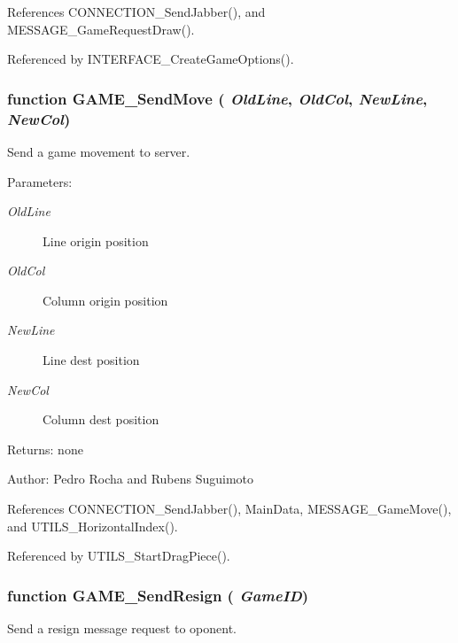 References CONNECTION\_\-SendJabber(), and MESSAGE\_\-GameRequestDraw().

Referenced by INTERFACE\_\-CreateGameOptions().
\subsubsection[GAME\_\-SendMove]{\setlength{\rightskip}{0pt plus 5cm}function GAME\_\-SendMove ( {\em OldLine}, \/   {\em OldCol}, \/   {\em NewLine}, \/   {\em NewCol})}\label{game_2game_8js_6c9721635c20c2b520a0b2c3fffb1aa8}


Send a game movement to server. 

\begin{Desc}
\item[Parameters:]
\begin{description}
\item[{\em OldLine}]Line origin position \item[{\em OldCol}]Column origin position \item[{\em NewLine}]Line dest position \item[{\em NewCol}]Column dest position \end{description}
\end{Desc}
\begin{Desc}
\item[Returns:]none \end{Desc}
\begin{Desc}
\item[Author:]Pedro Rocha and Rubens Suguimoto \end{Desc}


References CONNECTION\_\-SendJabber(), MainData, MESSAGE\_\-GameMove(), and UTILS\_\-HorizontalIndex().

Referenced by UTILS\_\-StartDragPiece().
\subsubsection[GAME\_\-SendResign]{\setlength{\rightskip}{0pt plus 5cm}function GAME\_\-SendResign ( {\em GameID})}\label{game_2game_8js_93e89b99f4dcbb84d118661b5208a64e}


Send a resign message request to oponent. 

